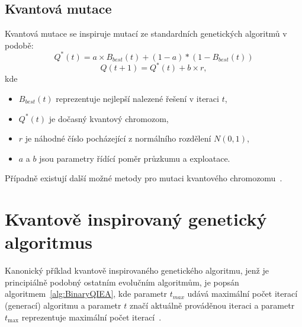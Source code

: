 \subsection{Kvantová mutace}\label{subsec:quantum-mutation}
Kvantová mutace se inspiruje mutací ze standardních genetických algoritmů v podobě:
\begin{equation*}
    Q^*(t) = a \times B_{best}(t) + (1 - a) * (1 - B_{best}(t))
\end{equation*}
\begin{equation*}
    Q(t+1) = Q^*(t) + b \times r,
\end{equation*}
kde
\begin{itemize}
    \item $B_{best}(t)$ reprezentuje nejlepší nalezené řešení v iteraci $t$,
    \item $Q^*(t)$ je dočasný kvantový chromozom,
    \item $r$ je náhodné číslo pocházející z normálního rozdělení $N(0,1)$,
    \item $a$ a $b$ jsou parametry řídící poměr průzkumu a exploatace.
\end{itemize}
Případně existují další možné metody pro mutaci kvantového chromozomu~\cite{NaturalComputing}.

\section{Kvantově inspirovaný genetický algoritmus}
Kanonický příklad kvantově inspirovaného genetického algoritmu, jenž je principiálně podobný ostatním evolučním algoritmům, je popsán algoritmem~\ref{alg:BinaryQIEA}, kde parametr $t_{max}$ udává maximální počet iterací (generací) algoritmu a parametr $t$ značí aktuálně prováděnou iteraci a parametr $t_{\text{max}}$ reprezentuje maximální počet iterací~\cite{NaturalComputing}. 

